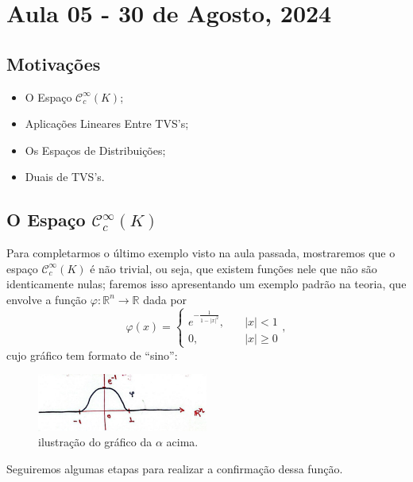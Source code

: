 \documentclass[../distribution_theory_notes.tex]{subfiles}
\begin{document}
\section{Aula 05 - 30 de Agosto, 2024}
\subsection{Motivações}
\begin{itemize}
 \item O Espaço \(\mathcal{C}_{c}^{\infty}(K)\);
 \item Aplicações Lineares Entre TVS's;
 \item Os Espaços de Distribuições;
 \item Duais de TVS's.
\end{itemize}
\subsection{O Espaço \(\mathcal{C}_{c}^{\infty}(K)\)}
  Para completarmos o último exemplo visto na aula passada, mostraremos que o espaço \(\mathcal{C}_{c}^{\infty}(K)\) é não trivial, ou seja, que existem funções nele que não são identicamente nulas; faremos isso apresentando um exemplo padrão na teoria, que envolve a função \(\varphi :\mathbb{R}^{n}\rightarrow \mathbb{R}\) dada por 
    \[
      \varphi(x) = \left\{\begin{array}{ll}
          e^{-\frac{1}{1-|x|^{2}}}, &\quad |x| < 1\\ 
          0, &\quad  |x|\geq 0
        \end{array}\right.,
    \]
    cujo gráfico tem formato de ``sino'': 
   \begin{figure}[H]
   \begin{center}
   \includegraphics[height=0.5\textheight, width=0.5\textwidth, keepaspectratio]{./Images/bell_curve_05.png}
   \end{center}
   \caption{ilustração do gráfico da \(\alpha \) acima.}
   \end{figure}

   Seguiremos algumas etapas para realizar a confirmação dessa função. 
\end{document}
